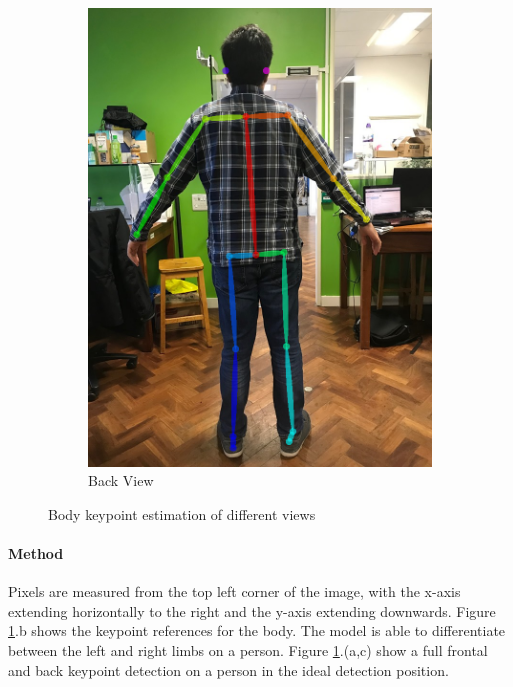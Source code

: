 \begin{figure}[ht]
\begin{subfigure}[b]{.32\textwidth}
		\includegraphics[width=1.0\linewidth]{img/chapter5_implementation/shreyBack.png}
		\caption{Back View}
	\end{subfigure}
	\vspace{-1\baselineskip}
	\begin{center}
		\caption{Body keypoint estimation of different views}
		\label{fig:keypointShrey}
	\end{center}
	\vspace{-2\baselineskip}
\end{figure}

\paragraph{Method} Pixels are measured from the top left corner of the image, with the x-axis extending horizontally to the right and the y-axis extending downwards. Figure \ref{fig:keypointShrey}.b shows the keypoint references for the body. The model is able to differentiate between the left and right limbs on a person. Figure \ref{fig:keypointShrey}.(a,c) show a full frontal and back keypoint detection on a person in the ideal detection position. 


